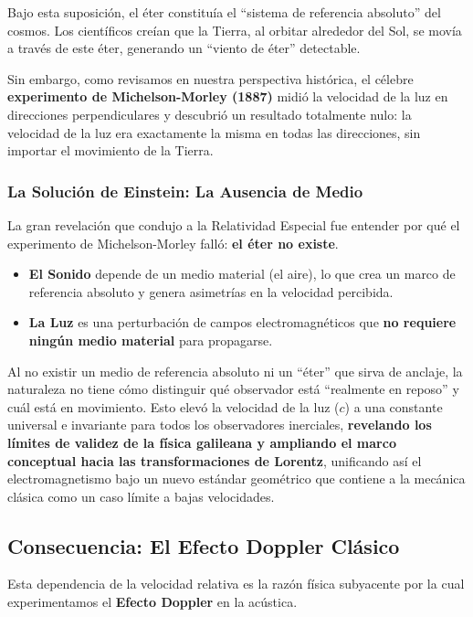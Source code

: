 \documentclass[11pt,a4paper]{book}
\begin{document}
Bajo esta suposición, el éter constituía el ``sistema de referencia absoluto'' del cosmos. Los científicos creían que la Tierra, al orbitar alrededor del Sol, se movía a través de este éter, generando un ``viento de éter'' detectable. 

Sin embargo, como revisamos en nuestra perspectiva histórica, el célebre \textbf{experimento de Michelson-Morley (1887)} midió la velocidad de la luz en direcciones perpendiculares y descubrió un resultado totalmente nulo: la velocidad de la luz era exactamente la misma en todas las direcciones, sin importar el movimiento de la Tierra. 

\subsubsection{La Solución de Einstein: La Ausencia de Medio}

La gran revelación que condujo a la Relatividad Especial fue entender por qué el experimento de Michelson-Morley falló: \textbf{el éter no existe}. 

\begin{itemize}
    \item \textbf{El Sonido} depende de un medio material (el aire), lo que crea un marco de referencia absoluto y genera asimetrías en la velocidad percibida.
    \item \textbf{La Luz} es una perturbación de campos electromagnéticos que \textbf{no requiere ningún medio material} para propagarse. 
\end{itemize}

Al no existir un medio de referencia absoluto ni un ``éter'' que sirva de anclaje, la naturaleza no tiene cómo distinguir qué observador está ``realmente en reposo'' y cuál está en movimiento. Esto elevó la velocidad de la luz ($c$) a una constante universal e invariante para todos los observadores inerciales, \textbf{revelando los límites de validez de la física galileana y ampliando el marco conceptual hacia las transformaciones de Lorentz}, unificando así el electromagnetismo bajo un nuevo estándar geométrico que contiene a la mecánica clásica como un caso límite a bajas velocidades.

\subsection*{Consecuencia: El Efecto Doppler Clásico}

Esta dependencia de la velocidad relativa es la razón física subyacente por la cual experimentamos el \textbf{Efecto Doppler} en la acústica. 
\end{document}
